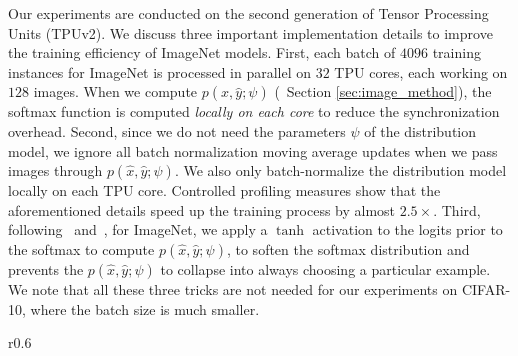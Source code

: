 Our experiments are conducted on the second generation of Tensor Processing Units (TPUv2). We discuss three important implementation details to improve the training efficiency of ImageNet models. First, each batch of $4096$ training instances for ImageNet is processed in parallel on $32$ TPU cores, each working on $128$ images. When we compute $p(\hat{x}, \hat{y}; \psi)$ (\cf~Section \ref{sec:image_method}), the softmax function is computed \textit{locally on each core} to reduce the synchronization overhead. Second, since we do not need the parameters $\psi$ of the distribution model, we ignore all batch normalization moving average updates when we pass images through $p(\hat{x}, \hat{y}; \psi)$. We also only batch-normalize the distribution model locally on each TPU core. Controlled profiling measures show that the aforementioned details speed up the training process by almost $2.5 \times$. Third, following~\citet{neural_combi} and~\citet{enas}, for ImageNet, we apply a $\tanh$ activation to the logits prior to the softmax to compute $p(\hat{x}, \hat{y}; \psi)$, to soften the softmax distribution and prevents the $p(\hat{x}, \hat{y}; \psi)$ to collapse into always choosing a particular example. We note that all these three tricks are not needed for our experiments on CIFAR-10, where the batch size is much smaller.

\begin{wraptable}{r}{0.6\textwidth}
\vspace{-1cm}
\end{wraptable}

